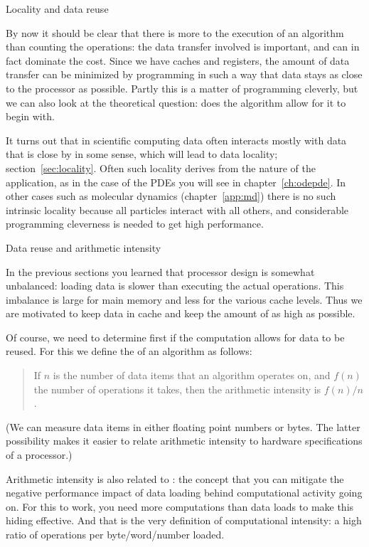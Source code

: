  {Locality and data reuse}

By now it should be clear that there is more to the execution of an
algorithm than counting the operations: the data transfer involved is
important, and can in fact dominate the cost. Since we have caches and
registers, the amount of data transfer can be minimized by programming
in such a way that data stays as close to the processor as
possible. Partly this is a matter of programming cleverly, but we can
also look at the theoretical question: does the algorithm allow for it
to begin with.

It turns out that in scientific computing data often
interacts mostly with data that is close by in some sense, which will
lead to data locality; section~\ref{sec:locality}. Often such locality
derives from the nature of the application, as in the case of the \acp{PDE} you
will see in chapter~\ref{ch:odepde}. In other cases such as molecular
dynamics (chapter~\ref{app:md}) there is no such intrinsic locality
because all particles interact with all others,
and considerable programming cleverness is needed to get high performance.

 {Data reuse and arithmetic intensity}
\label{sec:reuse}
\label{sec:gemm}
\label{sec:intensity}

In the previous sections you learned that processor design is somewhat unbalanced:
loading data is slower than executing the actual operations.
This imbalance is large for main memory and less for the various cache levels.
Thus we are motivated to keep data in cache and 
keep the amount of   as high as possible.

Of course, we need to determine first if the computation allows for data to be
reused.
For this we define the  
of an algorithm as follows:
\begin{quote}
  If $n$ is the number of data items that an algorithm operates on, and
  $f(n)$ the number of operations it takes, then the arithmetic intensity is
  $f(n)/n$.
\end{quote}
(We can measure data items in either floating point numbers or bytes.
The latter possibility makes it easier to relate arithmetic intensity
to hardware specifications of a processor.)

Arithmetic intensity is also related to :
the concept that you can mitigate the negative performance impact
of data loading
behind computational activity going on.
%
For this to work, you need more computations than data loads to make
this hiding effective. And that is the very definition of
computational intensity: a high ratio of operations per
byte/word/number loaded.

